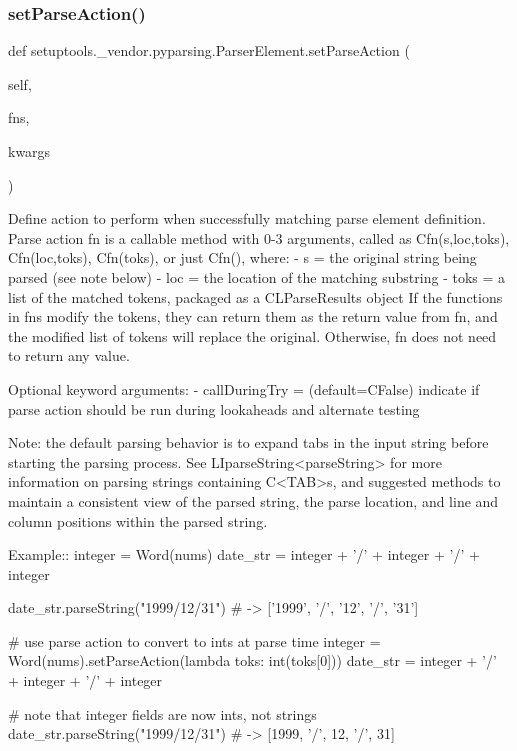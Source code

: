 \subsubsection{\texorpdfstring{set\+Parse\+Action()}{setParseAction()}}
{\footnotesize\ttfamily def setuptools.\+\_\+vendor.\+pyparsing.\+Parser\+Element.\+set\+Parse\+Action (\begin{DoxyParamCaption}\item[{}]{self,  }\item[{}]{fns,  }\item[{}]{kwargs }\end{DoxyParamCaption})}

\begin{DoxyVerb}Define action to perform when successfully matching parse element definition.
Parse action fn is a callable method with 0-3 arguments, called as C{fn(s,loc,toks)},
C{fn(loc,toks)}, C{fn(toks)}, or just C{fn()}, where:
 - s   = the original string being parsed (see note below)
 - loc = the location of the matching substring
 - toks = a list of the matched tokens, packaged as a C{L{ParseResults}} object
If the functions in fns modify the tokens, they can return them as the return
value from fn, and the modified list of tokens will replace the original.
Otherwise, fn does not need to return any value.

Optional keyword arguments:
 - callDuringTry = (default=C{False}) indicate if parse action should be run during lookaheads and alternate testing

Note: the default parsing behavior is to expand tabs in the input string
before starting the parsing process.  See L{I{parseString}<parseString>} for more information
on parsing strings containing C{<TAB>}s, and suggested methods to maintain a
consistent view of the parsed string, the parse location, and line and column
positions within the parsed string.

Example::
    integer = Word(nums)
    date_str = integer + '/' + integer + '/' + integer

    date_str.parseString("1999/12/31")  # -> ['1999', '/', '12', '/', '31']

    # use parse action to convert to ints at parse time
    integer = Word(nums).setParseAction(lambda toks: int(toks[0]))
    date_str = integer + '/' + integer + '/' + integer

    # note that integer fields are now ints, not strings
    date_str.parseString("1999/12/31")  # -> [1999, '/', 12, '/', 31]
\end{DoxyVerb}
 \mbox{\label{classsetuptools_1_1__vendor_1_1pyparsing_1_1_parser_element_a3c4dc5305a3369fad37fc46442079a69}} 
